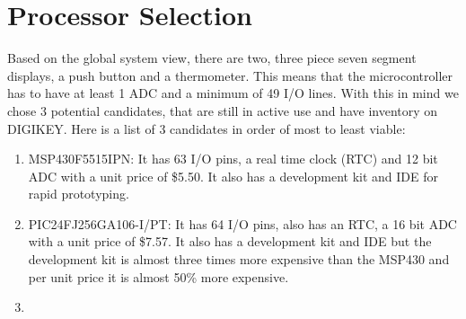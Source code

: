 \section{Processor Selection}
Based on the global system view, there are two, three piece seven segment displays, a push button and a thermometer. This means that the microcontroller has to have at least 1 ADC and a minimum of 49 I/O lines. With this in mind we chose 3 potential candidates, that are still in active use and have inventory on DIGIKEY. Here is a list of 3 candidates in order of most to least viable:
\begin{enumerate}
  \item MSP430F5515IPN: It has 63 I/O pins, a real time clock (RTC) and 12 bit ADC with a unit price of \$5.50. It also has a development kit and IDE for rapid prototyping.
  \item PIC24FJ256GA106-I/PT: It has 64 I/O pins, also has an RTC, a 16 bit ADC with a unit price of \$7.57. It also has a development kit and IDE but the development kit is almost three times more expensive than the MSP430 and per unit price it is almost 50\% more expensive.
        \item
\end{enumerate}
